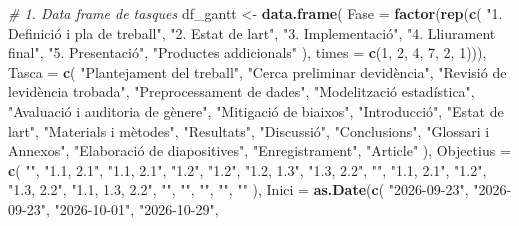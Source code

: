 \documentclass[CAT]{TFUOC}%
\newenvironment{Shaded}{\begin{snugshade}}{\end{snugshade}}
\newcommand{\AttributeTok}[1]{\textcolor[rgb]{0.13,0.29,0.53}{#1}}
\newcommand{\CommentTok}[1]{\textcolor[rgb]{0.56,0.35,0.01}{\textit{#1}}}
\newcommand{\DecValTok}[1]{\textcolor[rgb]{0.00,0.00,0.81}{#1}}
\newcommand{\FunctionTok}[1]{\textcolor[rgb]{0.13,0.29,0.53}{\textbf{#1}}}
\newcommand{\NormalTok}[1]{#1}
\newcommand{\OtherTok}[1]{\textcolor[rgb]{0.56,0.35,0.01}{#1}}
\newcommand{\StringTok}[1]{\textcolor[rgb]{0.31,0.60,0.02}{#1}}
\begin{document}
\begin{Shaded}
\begin{Highlighting}[]
\CommentTok{\# 1. Data frame de tasques}
\NormalTok{df\_gantt }\OtherTok{\textless{}{-}} \FunctionTok{data.frame}\NormalTok{(}
  \AttributeTok{Fase =} \FunctionTok{factor}\NormalTok{(}\FunctionTok{rep}\NormalTok{(}\FunctionTok{c}\NormalTok{(}
    \StringTok{"1. Definició i pla de treball"}\NormalTok{,}
    \StringTok{"2. Estat de l\textquotesingle{}art"}\NormalTok{,}
    \StringTok{"3. Implementació"}\NormalTok{,}
    \StringTok{"4. Lliurament final"}\NormalTok{,}
    \StringTok{"5. Presentació"}\NormalTok{, }
    \StringTok{"Productes addicionals"}
\NormalTok{  ), }\AttributeTok{times =} \FunctionTok{c}\NormalTok{(}\DecValTok{1}\NormalTok{, }\DecValTok{2}\NormalTok{, }\DecValTok{4}\NormalTok{, }\DecValTok{7}\NormalTok{, }\DecValTok{2}\NormalTok{, }\DecValTok{1}\NormalTok{))),}
  \AttributeTok{Tasca =} \FunctionTok{c}\NormalTok{(}
    \StringTok{"Plantejament del treball"}\NormalTok{, }
    \StringTok{"Cerca preliminar d\textquotesingle{}evidència"}\NormalTok{, }
    \StringTok{"Revisió de l\textquotesingle{}evidència trobada"}\NormalTok{, }
    \StringTok{"Preprocessament de dades"}\NormalTok{, }
    \StringTok{"Modelització estadística"}\NormalTok{, }
    \StringTok{"Avaluació i auditoria de gènere"}\NormalTok{, }
    \StringTok{"Mitigació de biaixos"}\NormalTok{, }
    \StringTok{"Introducció"}\NormalTok{, }
    \StringTok{"Estat de l\textquotesingle{}art"}\NormalTok{, }
    \StringTok{"Materials i mètodes"}\NormalTok{, }
    \StringTok{"Resultats"}\NormalTok{, }
    \StringTok{"Discussió"}\NormalTok{, }
    \StringTok{"Conclusions"}\NormalTok{, }
    \StringTok{"Glossari i Annexos"}\NormalTok{, }
    \StringTok{"Elaboració de diapositives"}\NormalTok{, }
    \StringTok{"Enregistrament"}\NormalTok{, }
    \StringTok{"Article"}
\NormalTok{  ),}
  \AttributeTok{Objectius =} \FunctionTok{c}\NormalTok{(}
    \StringTok{""}\NormalTok{, }\StringTok{"1.1, 2.1"}\NormalTok{, }\StringTok{"1.1, 2.1"}\NormalTok{, }\StringTok{"1.2"}\NormalTok{,}
    \StringTok{"1.2"}\NormalTok{, }\StringTok{"1.2, 1.3"}\NormalTok{, }\StringTok{"1.3, 2.2"}\NormalTok{, }\StringTok{""}\NormalTok{,}
    \StringTok{"1.1, 2.1"}\NormalTok{, }\StringTok{"1.2"}\NormalTok{, }\StringTok{"1.3, 2.2"}\NormalTok{, }\StringTok{"1.1, 1.3, 2.2"}\NormalTok{,}
    \StringTok{""}\NormalTok{, }\StringTok{""}\NormalTok{, }\StringTok{""}\NormalTok{, }\StringTok{""}\NormalTok{, }\StringTok{""}
\NormalTok{  ),}
  \AttributeTok{Inici =} \FunctionTok{as.Date}\NormalTok{(}\FunctionTok{c}\NormalTok{(}
    \StringTok{"2026{-}09{-}23"}\NormalTok{, }\StringTok{"2026{-}09{-}23"}\NormalTok{, }\StringTok{"2026{-}10{-}01"}\NormalTok{, }\StringTok{"2026{-}10{-}29"}\NormalTok{,}

\end{Highlighting}
\end{Shaded}
\end{document}
